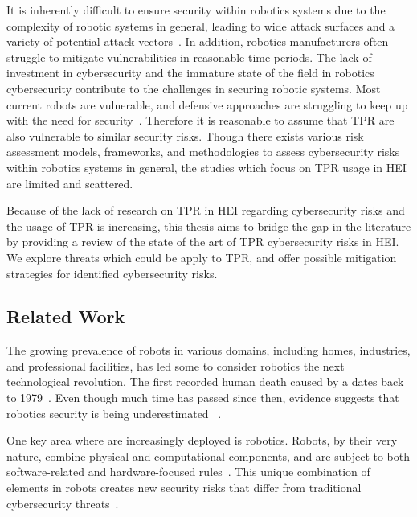 It is inherently difficult to ensure security within robotics systems due to the complexity of robotic systems in general, leading to
wide
attack surfaces
and a variety
of potential attack vectors~\cite[2]{robot_security_review_2022}. In addition, robotics manufacturers often struggle to mitigate
vulnerabilities in reasonable time periods. The lack of investment in cybersecurity and the
immature state of the field in robotics cybersecurity contribute
to the challenges in securing robotic systems.
Most current robots are vulnerable, and defensive approaches are struggling
to keep up with the need for security~\cite[12]{robot_security_review_2022}. Therefore it is reasonable to assume that \ac{TPR} are also
vulnerable to similar security risks. Though there exists various risk assessment models, frameworks, and methodologies to assess
cybersecurity risks within robotics systems in general, the studies which focus on \ac{TPR} usage in \ac{HEI} are limited and scattered.

Because of the lack of research on \ac{TPR} in \ac{HEI} regarding cybersecurity risks and the usage of \ac{TPR}
is increasing, this thesis aims to bridge the gap in the literature by providing a review of the state of the art of
\ac{TPR} cybersecurity risks in \ac{HEI}. We explore  threats which could be apply to \ac{TPR}, and offer possible
mitigation strategies for identified cybersecurity risks.

\subsection{Related Work}
The growing prevalence of robots in various domains, including homes, industries, and professional facilities, has led some to
consider robotics the next technological revolution.  The first recorded human death caused by a 
dates back to 1979~\cite[2]{robot_security_review_2022}. Even though much time has passed since then, evidence suggests that robotics security is being underestimated
~\cite[1-2]{
  robot_security_framework_2018}.

One key area where  are increasingly deployed is robotics. Robots, by their very nature, combine physical and computational components, and are subject to both software-related and hardware-focused rules~\cite[6]{cyber_sec_safety_robots_legal_2021}. This unique combination of elements in robots creates new security risks that differ from traditional cybersecurity threats~\cite[3]{cyber_security_issues_in_robotics_2021}.

